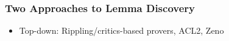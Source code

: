 \documentclass[serif,professionalfont]{beamer}
\newcommand\dn[0]{\vspace{\baselineskip}}
\begin{document}
\begin{frame}
  \frametitle{Two Approaches to Lemma Discovery}

    \begin{overprint}

    \begin{itemize}
      \item Top-down: Rippling/critics-based provers, ACL2, Zeno
    \end{itemize}


    \rotateprop \rotatestep \stuck


     \tricky


    \tricky
    \dn
    \trickylemmas
    \end{overprint}

\end{frame}


\end{document}
